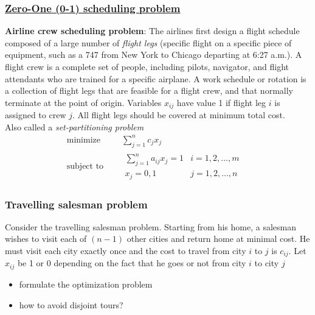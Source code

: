 \documentclass[c]{beamer}
\begin{document}
\begin{frame}
  \frametitle{\href{https://fastercapital.com/content/Optimization--Solving-Complex-Problems-with-Zero-One-Integer-Programming.html}{Zero-One (0-1) scheduling problem}}

  {\bf Airline crew scheduling problem}: The airlines first design a flight schedule composed of a large number of {\em flight legs} (specific flight on a specific piece of equipment, such as a 747 from New York to Chicago departing at 6:27 a.m.). A flight crew is a complete set of people, including pilots, navigator, and flight attendants who are trained for a specific airplane. A work schedule or rotation is a collection of flight legs that are feasible for a flight crew, and that normally terminate at the point of origin. Variables $x_{ij}$ have value 1 if flight leg $i$ is assigned to crew $j$. All flight legs should be covered at minimum total cost. 
  \\[10pt]
  Also called a {\em set-partitioning problem}
  \begin{equation*}
    \begin{aligned}
      \text{minimize } \quad & \sum_{j=1}^{n} c_j x_j \\
      \text{subject to }\quad &
      \begin{array}{rcl}
        \sum_{j=1}^n a_{ij} x_j= 1&i=1,2,\ldots,m&  \\
        x_j = {0,1} &j=1,2,\ldots,n
      \end{array}
    \end{aligned}
  \end{equation*}

\end{frame}

\begin{frame}
  \frametitle{Travelling salesman problem}

  \begin{Exercise}
    Consider the travelling salesman problem. Starting from his home, a salesman wishes to visit each of $(n-1)$ other cities and return home at minimal cost. He must visit each city exactly once and the cost to travel from city $i$ to $j$ is $c_{ij}$. Let $x_{ij}$ be 1 or 0 depending on the fact that he goes or not from city $i$ to city $j$
    \begin{itemize}
      \item formulate the optimization problem
      \item how to avoid disjoint tours?
    \end{itemize}
  \end{Exercise}

\end{frame}
\end{document}
